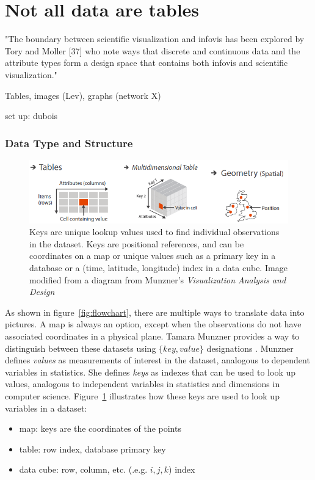 \documentclass[../main.tex]{subfiles}
\begin{document}
\section{Not all data are tables}

"The boundary between scientific visualization and infovis has been explored by Tory and Moller [37] who note ways that discrete and continuous data and the attribute types form a design space that contains both infovis and scientific visualization." \cite{pousmanCasualInformation2007}

Tables, images (Lev), graphs (network X)

set up: dubois
\subsubsection{Data Type and Structure}
\label{sec:intro_data_structure}
\begin{figure}[h!]
 \includegraphics[width=\textwidth]{figures/intro/munzner_datatypes}
\caption{Keys are unique lookup values used to find individual observations in the dataset. Keys are positional references, and can be coordinates on a map or unique values such as a primary key in a database or a (time, latitude, longitude) index in a data cube. Image modified from a diagram from Munzner's \textit{Visualization Analysis and Design} \cite{munznerVisualizationAnalysisDesign2014}}
\label{fig:munzner_datatypes}
\end{figure}

As shown in figure~\ref{fig:flowchart}, there are multiple ways to translate data into pictures. A map is always an option, except when the observations do not have associated coordinates in a physical plane. Tamara Munzner provides a way to distinguish between these datasets using $\{key, value\}$ designations \cite{munznerVisualizationAnalysisDesign2014}. Munzner defines \textit{values} as measurements of interest in the dataset, analogous to dependent variables in statistics. She defines \textit{keys} as indexes that can be used to look up values, analogous to independent variables in statistics and dimensions in computer science. Figure~\ref{fig:munzner_datatypes} illustrates how these keys are used to look up variables in a dataset: 
\begin{itemize}
	\item map: keys are the coordinates of the points
	\item table: row index, database primary key
	\item data cube: row, column, etc. (.e.g. $i,j,k$) index
\end{itemize}
\end{document}
